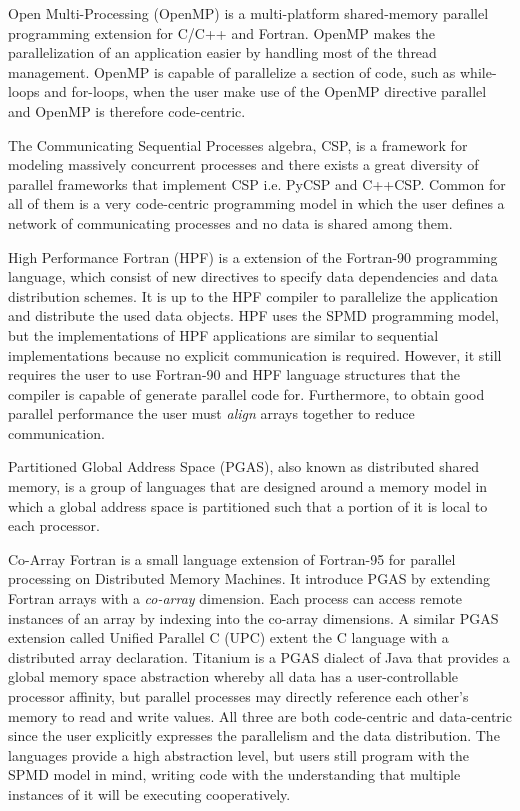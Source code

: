 \documentclass[preprint]{../PGAS10/sigplanconf}
\begin{document}
Open Multi-Processing (OpenMP)\cite{Dagum98} is a multi-platform shared-memory parallel programming extension for C/C++ and Fortran. OpenMP makes the parallelization of an application easier by handling most of the thread management. OpenMP is capable of parallelize a section of code, such as while-loops and for-loops, when the user make use of the OpenMP directive parallel and OpenMP is therefore code-centric.

The Communicating Sequential Processes algebra, CSP\cite{CSPHoare78}, is a framework for modeling massively concurrent processes and there exists a great diversity of parallel frameworks that implement CSP i.e. PyCSP\cite{PyCSP07} and C++CSP\cite{CSP_Brown03}. Common for all of them is a very code-centric programming model in which the user defines a network of communicating processes and no data is shared among them.

High Performance Fortran (HPF) \cite{Loveman93} is a extension of the Fortran-90 programming language, which consist of new directives to specify data dependencies and data distribution schemes. It is up to the HPF compiler to parallelize the application and distribute the used data objects. HPF uses the SPMD programming model, but the implementations of HPF applications are similar to sequential implementations because no explicit communication is required. However, it still requires the user to use Fortran-90 and HPF language structures that the compiler is capable of generate parallel code for. Furthermore, to obtain good parallel performance the user must \emph{align} arrays together to reduce communication.

Partitioned Global Address Space (PGAS), also known as distributed shared memory, is a group of languages that are designed around a memory model in which a global address space is partitioned such that a portion of it is local to each processor.

Co-Array Fortran\cite{Co-arrayFortran98} is a small language extension of Fortran-95 for parallel processing on Distributed Memory Machines. It introduce PGAS by extending Fortran arrays with a \emph{co-array} dimension. Each process can access remote instances of an array by indexing into the co-array dimensions. A similar PGAS extension called Unified Parallel C (UPC)\cite{Carlson99_UPC} extent the C language with a distributed array declaration. Titanium\cite{Yelick1998_Titanium} is a PGAS dialect of Java that provides a global memory space abstraction whereby all data has a user-controllable processor affinity, but parallel processes may directly reference each other's memory to read and write values. All three are both code-centric and data-centric since the user explicitly expresses the parallelism and the data distribution. The languages provide a high abstraction level, but users still program with the SPMD model in mind, writing code with the understanding that multiple instances of it will be executing cooperatively.
\end{document}

